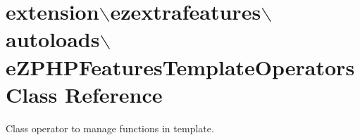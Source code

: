 \hypertarget{classextension_1_1ezextrafeatures_1_1autoloads_1_1e_z_p_h_p_features_template_operators}{\section{extension$\backslash$ezextrafeatures$\backslash$autoloads$\backslash$e\-Z\-P\-H\-P\-Features\-Template\-Operators Class Reference}
\label{classextension_1_1ezextrafeatures_1_1autoloads_1_1e_z_p_h_p_features_template_operators}
}


Class operator to manage functions in template.  



